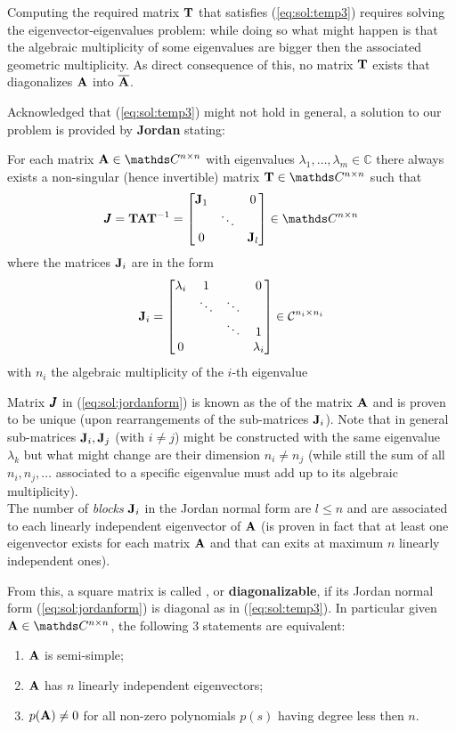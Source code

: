 	Computing the required matrix $\mathbf{T}$ that satisfies (\ref{eq:sol:temp3}) requires solving the eigenvector-eigenvalues problem: while doing so what might happen is that the algebraic multiplicity of some eigenvalues are bigger then the associated geometric multiplicity. As direct consequence of this, no matrix $\mathbf{T}$ exists that diagonalizes $\mathbf{A}$ into $\overline {\mathbf{A}}$.
	
	Acknowledged that (\ref{eq:sol:temp3}) might not hold in general, a solution to our problem is provided by \textbf{Jordan} stating:
	\begin{theorem} \label{th:cayley}
		For each matrix $\A \in \mathds C^{n\times n}$ with eigenvalues $\lambda_1, \dots, \lambda_m \in \mathds C$ there always exists a non-singular (hence invertible) matrix $\T \in \mathds C^{n\times n}$ such that
		\begin{equation} \label{eq:sol:jordanform}
			\jordan = \T \A \T^{-1} = \matrix{\mat J_1 & & 0 \\ & \ddots \\ 0 & & \mat J_l} \in \mathds C^{n\times n}
		\end{equation}
		where the matrices $\mathbf{J}_i$ are in the form
		\begin{equation}
			\mathbf{J}_i = \begin{bmatrix}  \lambda_i & 1 & & 0 \\ & \ddots & \ddots \\ & & \ddots & 1 \\ 0 & & & \lambda_i  \end{bmatrix} \in \mathcal C^{n_i\times n_i}
		\end{equation}
		with $n_i$ the algebraic multiplicity of the $i$-th eigenvalue
	\end{theorem}
	Matrix $\pmb{J}$ in (\ref{eq:sol:jordanform}) is known as the  of the matrix $\mathbf{A}$ and is proven to be unique (upon rearrangements of the sub-matrices $\mathbf{J}_i$). Note that in general sub-matrices $\mathbf{J}_i,\mathbf{J}_j$ (with $i\neq j$) might be constructed with the same eigenvalue $\lambda_k$ but what might change are their dimension $n_i\neq n_j$ (while still the sum of all $n_i,n_j,\dots$ associated to a specific eigenvalue must add up to its algebraic multiplicity).\\
	The number of \textit{blocks} $\mathbf{J}_i$ in the Jordan normal form are $l \leq n$ and are associated to each linearly independent eigenvector of $\mathbf{A}$ (is proven in fact that at least one eigenvector exists for each matrix $\mathbf{A}$ and that can exits at maximum $n$ linearly independent ones).
	
	From this, a square matrix is called , or \textbf{diagonalizable}, if its  Jordan normal form (\ref{eq:sol:jordanform}) is diagonal as in (\ref{eq:sol:temp3}). In particular given $\A \in \mathds C^{n\times n}$, the following 3 statements are equivalent:
	\begin{enumerate}[\itshape i)]
		\item $\mathbf{A}$ is semi-simple;
		\item $\mathbf{A}$ has $n$ linearly independent eigenvectors;
		\item $p(\mathbf{A}) \neq 0$ for all non-zero polynomials $p(s)$ having degree less then $n$.
	\end{enumerate}
	
